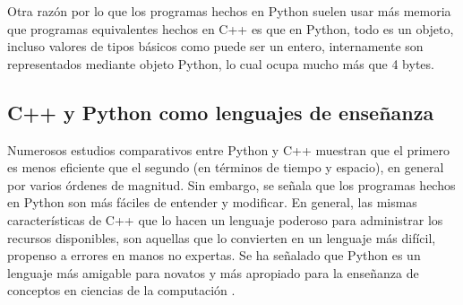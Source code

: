 Otra razón por lo que los programas hechos en Python suelen usar más memoria
que programas equivalentes hechos en C++ es que en Python, todo es un objeto,
incluso valores de tipos básicos como puede ser un entero, internamente son
representados mediante objeto Python, lo cual ocupa mucho más que 4 bytes.

\subsection{C++ y Python como lenguajes de enseñanza}

Numerosos estudios comparativos entre Python y C++
\cite{zehra}\cite{Abdulkareem} muestran que el primero es menos eficiente que
el segundo (en términos de tiempo y espacio), en general por varios órdenes de
magnitud. Sin embargo, se señala que los programas hechos en Python son más
fáciles de entender y modificar. En general, las mismas características de C++
que lo hacen un lenguaje poderoso para administrar los recursos disponibles,
son aquellas que lo convierten en un lenguaje más difícil, propenso a errores
en manos no expertas. Se ha señalado que Python es un lenguaje más amigable
para novatos y más apropiado para la enseñanza de conceptos en ciencias de la
computación \cite{fraire}.
